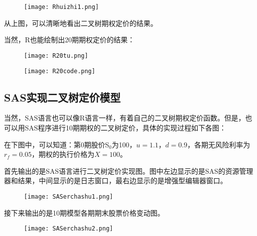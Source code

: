 	\begin{figure}[htb] %
		\centering
		\texttt{[image: Rhuizhi1.png]}
		\label{fig:xfig1}
	\end{figure}

	从上图，可以清晰地看出二叉树期权定价的结果。

	当然，R也能绘制出20期期权定价的结果：
	
	\begin{figure}[htb] %
		\centering
		\texttt{[image: R20tu.png]}
		\label{fig:xfig1}
	\end{figure}
	
	
	\begin{figure}[htb] %
		\centering
		\texttt{[image: R20code.png]}
		\label{fig:xfig1}
	\end{figure}




\subsection{SAS实现二叉树定价模型}
	当然，SAS语言也可以像R语言一样，有着自己的二叉树期权定价函数。但是，也可以用SAS程序进行10期期权的二叉树定价，具体的实现过程如下各图：
	
	在下图中，可以知道：第0期股价S$_{0}$为100，$u=1.1，d=0.9$，各期无风险利率为$ r_{f}=0.05 $，期权的执行价格为$X=100$。
	
	首先输出的是SAS语言进行二叉树定价实现图。图中左边显示的是SAS的资源管理器和结果，中间显示的是日志窗口，最右边显示的是增强型编辑器窗口。
	
	\begin{figure}[htb] %
		\centering
		\texttt{[image: SASerchashu1.png]}
		\label{fig:xfig1}
	\end{figure}
	
	接下来输出的是10期模型各期期末股票价格变动图。
	
	\begin{figure}[htb] %
		\centering
		\texttt{[image: SASerchashu2.png]}
		\label{fig:xfig1}
	\end{figure}
	
